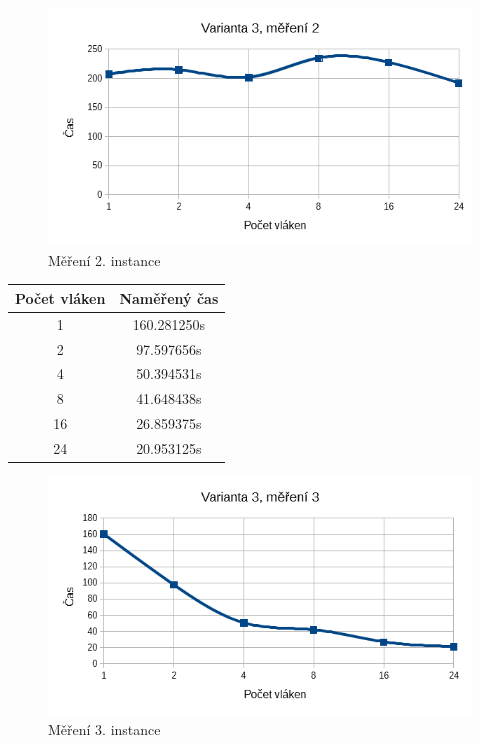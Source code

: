 \documentclass[12pt]{article}
\begin{document}
\begin{figure}[t]
  \begin{center}
      \includegraphics[width=12cm]{images/ssef2.png}
    \caption{Měření 2. instance} 
  \end{center}
\end{figure}

\begin{center}
\begin{tabular}{ c | c }
\textbf{Počet vláken} & \textbf{Naměřený čas} \\ \hline \hline 
1 & 160.281250s \\ \hline
2 & 97.597656s \\ \hline
4 & 50.394531s \\ \hline
8 & 41.648438s \\ \hline
16 & 26.859375s \\ \hline
24 & 20.953125s \\ \hline
\end{tabular}
\end{center}

\begin{figure}[t]
  \begin{center}
      \includegraphics[width=12cm]{images/ssef3.png}	
    \caption{Měření 3. instance} 
  \end{center}
\end{figure}
\end{document}
